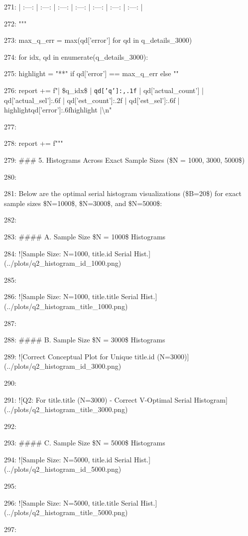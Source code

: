 \documentclass[11pt,a4paper]{article}
\begin{document}
{271: | :---: | :---: | :---: | :---: | :---: | :---: | :---: |

272: """

273:     max\_q\_err = max(qd['error'] for qd in q\_details\_3000)

274:     for idx, qd in enumerate(q\_details\_3000):

275:         highlight = "**" if qd['error'] == max\_q\_err else ""

276:         report += f"| \$q\_{{{idx}}}\$ | \texttt{{qd['q']:,.1f}} | {qd['actual\_count']} | {qd['actual\_sel']:.6f} | {qd['est\_count']:.2f} | {qd['est\_sel']:.6f} | {highlight}{qd['error']:.6f}{highlight} |\textbackslash{}n"

277:

278:     report += f"""

279: \#\#\# 5. Histograms Across Exact Sample Sizes (\$N = 1000, 3000, 5000\$)

280:

281: Below are the optimal serial histogram visualizations (\$B=20\$) for exact sample sizes \$N=1000\$, \$N=3000\$, and \$N=5000\$:

282:

283: \#\#\#\# A. Sample Size \$N = 1000\$ Histograms

284: ![Sample Size: N=1000, title.id Serial Hist.](../plots/q2\_histogram\_id\_1000.png)

285:

286: ![Sample Size: N=1000, title.title Serial Hist.](../plots/q2\_histogram\_title\_1000.png)

287:

288: \#\#\#\# B. Sample Size \$N = 3000\$ Histograms

289: ![Correct Conceptual Plot for Unique title.id (N=3000)](../plots/q2\_histogram\_id\_3000.png)

290:

291: ![Q2: For title.title (N=3000) - Correct V-Optimal Serial Histogram](../plots/q2\_histogram\_title\_3000.png)

292:

293: \#\#\#\# C. Sample Size \$N = 5000\$ Histograms

294: ![Sample Size: N=5000, title.id Serial Hist.](../plots/q2\_histogram\_id\_5000.png)

295:

296: ![Sample Size: N=5000, title.title Serial Hist.](../plots/q2\_histogram\_title\_5000.png)

297:

}
\end{document}
